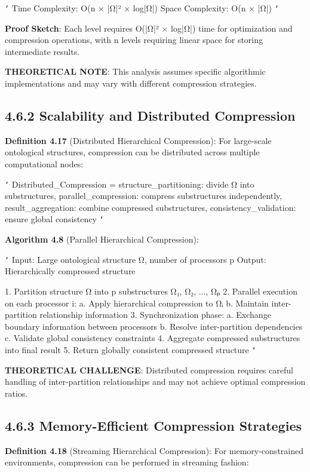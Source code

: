\texttt{`}
Time Complexity: O(n × |Ω|² × log|Ω|)
Space Complexity: O(n × |Ω|)
\texttt{`}

\textbf{Proof Sketch}: Each level requires O(|Ω|² × log|Ω|) time for optimization and compression operations, with n levels requiring linear space for storing intermediate results.

\textbf{THEORETICAL NOTE}: This analysis assumes specific algorithmic implementations and may vary with different compression strategies.

\subsection{4.6.2 Scalability and Distributed Compression}

\textbf{Definition 4.17} (Distributed Hierarchical Compression): For large-scale ontological structures, compression can be distributed across multiple computational nodes:

\texttt{`}
Distributed_Compression = {
    structure_partitioning: divide Ω into substructures,
    parallel_compression: compress substructures independently,
    result_aggregation: combine compressed substructures,
    consistency_validation: ensure global consistency
}
\texttt{`}

\textbf{Algorithm 4.8} (Parallel Hierarchical Compression):

\texttt{`}
Input: Large ontological structure Ω, number of processors p
Output: Hierarchically compressed structure

1. Partition structure Ω into p substructures {Ω₁, Ω₂, ..., Ωₚ}
2. Parallel execution on each processor i:
   a. Apply hierarchical compression to Ωᵢ
   b. Maintain inter-partition relationship information
3. Synchronization phase:
   a. Exchange boundary information between processors
   b. Resolve inter-partition dependencies
   c. Validate global consistency constraints
4. Aggregate compressed substructures into final result
5. Return globally consistent compressed structure
\texttt{`}

\textbf{THEORETICAL CHALLENGE}: Distributed compression requires careful handling of inter-partition relationships and may not achieve optimal compression ratios.

\subsection{4.6.3 Memory-Efficient Compression Strategies}

\textbf{Definition 4.18} (Streaming Hierarchical Compression): For memory-constrained environments, compression can be performed in streaming fashion:

